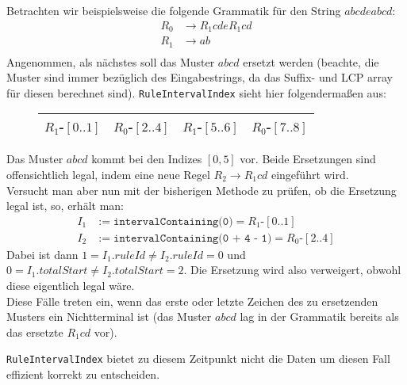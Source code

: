 Betrachten wir beispielsweise die folgende Grammatik für den String $abcdeabcd$:
\begin{align*}
	R_0 &\rightarrow R_1 c d e R_1 c d\\
	R_1 &\rightarrow a b\\
\end{align*}
Angenommen, als nächstes soll das Muster $abcd$ ersetzt werden (beachte, die Muster sind immer bezüglich des Eingabestrings, da das Suffix- und LCP array für diesen berechnet sind).
\texttt{RuleIntervalIndex} sieht hier folgendermaßen aus:
\begin{figure}[H]
	\centering
	\begin{tabular}{|c|c|c|c|} \hline
		$R_1$-$[0..1]$ & $R_0$-$[2..4]$ & $R_1$-$[5..6]$ & $R_0$-$[7..8]$ \\\hline
	\end{tabular}
\end{figure}

Das Muster $abcd$ kommt bei den Indizes $[0, 5]$ vor. Beide Ersetzungen sind offensichtlich legal, indem eine neue Regel $R_2 \rightarrow R_1cd$ eingeführt wird.\\ Versucht man aber nun mit der bisherigen Methode zu prüfen, ob die Ersetzung legal ist, so, erhält man:
\begin{align*}
	I_1 &:= \texttt{intervalContaining(0)} = R_1\text{-}[0..1]\\
	I_2 &:= \texttt{intervalContaining(0 + 4 - 1)} = R_0\text{-}[2..4]
\end{align*} 
Dabei ist dann $1 = I_1.ruleId \neq I_2.ruleId = 0$ und $0 = I_1.totalStart \neq I_2.totalStart = 2$. Die Ersetzung wird also verweigert, obwohl diese eigentlich legal wäre.\\
Diese Fälle treten ein, wenn das erste oder letzte Zeichen des zu ersetzenden Musters ein Nichtterminal ist (das Muster $abcd$ lag in der Grammatik bereits als das ersetzte $R_1 cd$ vor).

\texttt{RuleIntervalIndex} bietet zu diesem Zeitpunkt nicht die Daten um diesen Fall effizient korrekt zu entscheiden.